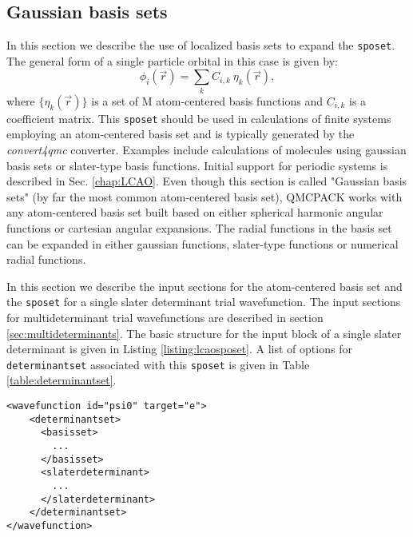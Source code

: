 \subsection{Gaussian basis sets}
\label{sec:gaussianbasis}

In this section we describe the use of localized basis sets to expand the \texttt{sposet}. The general form of a single particle orbital in this case is given by:
\begin{equation}
\phi_i(\vec{r}) = \sum_k C_{i,k} \ \eta_k(\vec{r}),
\end{equation}
where $\{\eta_k(\vec{r})\}$ is a set of M atom-centered basis
functions and $C_{i,k}$ is a coefficient matrix. This \texttt{sposet}
should be used in calculations of finite systems employing an
atom-centered basis set and is typically generated by the
\textit{convert4qmc} converter.  Examples include calculations of
molecules using gaussian basis sets or slater-type basis
functions. Initial support for periodic systems is described in Sec.
\ref{chap:LCAO}. Even though this section is called "Gaussian basis
sets" (by far the most common atom-centered basis set), QMCPACK works
with any atom-centered basis set built based on either spherical
harmonic angular functions or cartesian angular expansions. The radial
functions in the basis set can be expanded in either gaussian
functions, slater-type functions or numerical radial functions.

In this section we describe the input sections for the atom-centered basis set and the \texttt{sposet} for a single slater determinant trial wavefunction. The input sections for multideterminant trial wavefunctions are described in section \ref{sec:multideterminants}. The basic structure for the input block of a single slater determinant is given in Listing \ref{listing:lcaosposet}.
A list of options for \texttt{determinantset} associated with this \texttt{sposet} is given in Table \ref{table:determinantset}.

\begin{minipage}{\linewidth}
\begin{lstlisting}[caption=Basic input block for a single determinant trial wavefunction using a sposet expanded on an atom-centered basis set. \label{listing:lcaosposet}]
<wavefunction id="psi0" target="e">
    <determinantset>
      <basisset>
        ...
      </basisset>
      <slaterdeterminant>
        ...
      </slaterdeterminant>
    </determinantset>    
</wavefunction>
\end{lstlisting}
\end{minipage}

